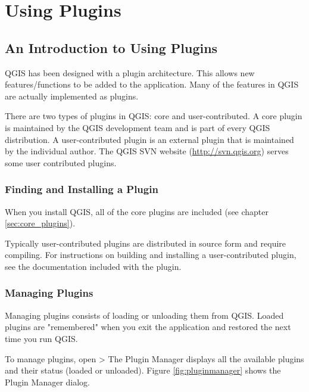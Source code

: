 \section{Using Plugins}


\subsection{An Introduction to Using Plugins}\label{label_introplugin}

QGIS has been designed with a plugin architecture.
This allows new features/functions to be added to the application.
Many of the features in QGIS are actually implemented as plugins.

There are two types of plugins in QGIS: core and user-contributed.
 A core plugin is maintained by the QGIS development team and is part of every QGIS distribution.
A user-contributed plugin is an external plugin that is maintained by the individual author.
The QGIS SVN website (\url{http://svn.qgis.org}) serves some user contributed plugins.

\subsubsection{Finding and Installing a Plugin}
When you install QGIS, all of the core plugins are included (see chapter \ref{sec:core_plugins}). 

Typically user-contributed plugins are distributed in source form and require compiling.
For instructions on building and installing a user-contributed plugin, see the documentation included with the plugin.

\subsubsection{Managing Plugins}\label{sec:managing_plugins}
 Managing plugins consists of loading or unloading them from QGIS.
Loaded plugins are "remembered" when you exit the application and restored the next time you run QGIS.

To manage plugins, open  > 
The Plugin Manager displays all the available plugins and their status (loaded or unloaded).
Figure \ref{fig:pluginmanager} shows the Plugin Manager dialog.

